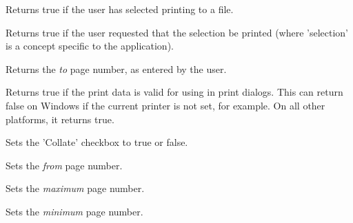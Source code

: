 
Returns true if the user has selected printing to a file.

\label{wxprintdialogdatagetselection}


Returns true if the user requested that the selection be printed (where 'selection' is
a concept specific to the application).

\label{wxprintdialogdatagettopage}


Returns the {\it to} page number, as entered by the user.

\label{wxprintdialogdataok}


Returns true if the print data is valid for using in print dialogs.
This can return false on Windows if the current printer is not set, for example.
On all other platforms, it returns true.

\label{wxprintdialogdatasetcollate}


Sets the 'Collate' checkbox to true or false.

\label{wxprintdialogdatasetfrompage}


Sets the {\it from} page number.

\label{wxprintdialogdatasetmaxpage}


Sets the {\it maximum} page number.

\label{wxprintdialogdatasetminpage}


Sets the {\it minimum} page number.

\label{wxprintdialogdatasetnocopies}


